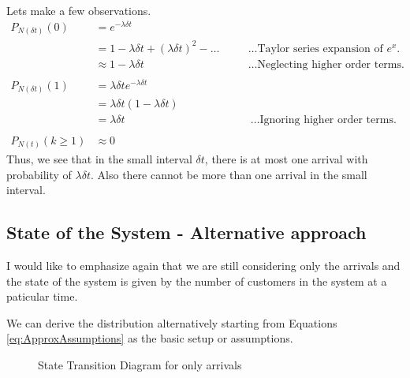 \documentclass[11pt, a4paper]{report}
\begin{document}
Lets make a few observations.
\begin{subequations}
    \begin{align}
        P_{N(\delta t)}(0) &= e^{-\lambda \delta t} \\
        &= 1 - \lambda \delta t + (\lambda \delta t)^2 - \ldots &&\quad \ldots \text{Taylor series expansion of } e^x.\\
        &\approx 1 - \lambda \delta t &&\quad \ldots \text{Neglecting higher order terms}.\\
        \\
        P_{N(\delta t)}(1) &= \lambda \delta t e^{-\lambda \delta t} \\ 
        &= \lambda \delta t (1 - \lambda \delta t) \\
        &= \lambda \delta t\ &&\quad\ \ldots\text{Ignoring higher order terms.}\\
        \\
        P_{N(t)}(k \geq 1) &\approx 0
    \end{align}    
    \label{eq:ApproxAssumptions}
\end{subequations}
Thus, we see that in the small interval $\delta t$, there is at most one arrival with probability of $\lambda \delta t$. Also there cannot be more than one arrival in the small interval.

\subsection{State of the System - Alternative approach}
I would like to emphasize again that we are still considering only the arrivals and the state of the system is given by the number of customers in the system at a paticular time.

We can derive the distribution alternatively starting from Equations \ref{eq:ApproxAssumptions} as the basic setup or assumptions. 

\begin{figure}
    \centering
    
    \caption{State Transition Diagram for only arrivals}
    \label{fig:arrSTD}
\end{figure}
\end{document}
